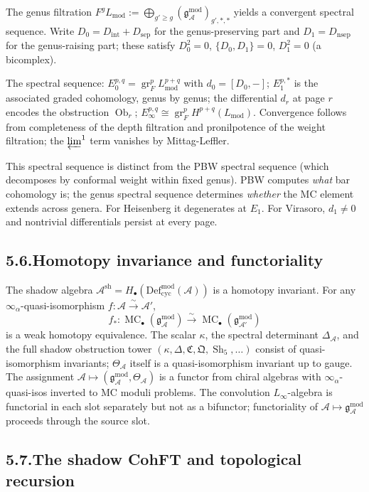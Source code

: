\documentclass[11pt]{report}
\theoremstyle{definition}
\theoremstyle{remark}
\providecommand{\cA}{\mathcal{A}}
\providecommand{\gAmod}{\mathfrak{g}^{\mathrm{mod}}_\cA}
\providecommand{\Defcyc}{\mathrm{Def}_{\mathrm{cyc}}}
\numberwithin{equation}{section}
\begin{document}
The genus filtration $F^g L_{\mathrm{mod}}:=\bigoplus_{g'\ge g}(\gAmod)_{g',*,*}$
yields a convergent spectral sequence. Write
$D_0=D_{\mathrm{int}}+D_{\mathrm{sep}}$ for the genus-preserving part
and $D_1=D_{\mathrm{nsep}}$ for the genus-raising part; these satisfy
$D_0^2=0$, $\{D_0,D_1\}=0$, $D_1^2=0$ (a bicomplex).

The spectral sequence: $E_0^{p,q}=\operatorname{gr}_F^p L_{\mathrm{mod}}^{p+q}$
with $d_0=[D_0,-]$; $E_1^{p,*}$ is the associated graded cohomology,
genus by genus; the differential $d_r$ at page $r$ encodes the
obstruction $\operatorname{Ob}_r$; $E_\infty^{p,q}\cong\operatorname{gr}_F^p H^{p+q}(L_{\mathrm{mod}})$.
Convergence follows from completeness of the depth filtration and
pronilpotence of the weight filtration; the $\varprojlim^1$ term
vanishes by Mittag-Leffler.

This spectral sequence is distinct from the PBW spectral sequence
(which decomposes by conformal weight within fixed genus). PBW
computes \emph{what} bar cohomology is; the genus spectral sequence
determines \emph{whether} the MC element extends across genera. For
Heisenberg it degenerates at $E_1$. For Virasoro, $d_1\neq 0$ and
nontrivial differentials persist at every page.

\subsection*{5.6.\enspace Homotopy invariance and functoriality}

The shadow algebra $\cA^{\mathrm{sh}}=H_\bullet(\Defcyc^{\mathrm{mod}}(\cA))$
is a homotopy invariant. For any $\infty_\alpha$-quasi-isomorphism
$f\colon\cA\xrightarrow{\sim}\cA'$,
\[
f_*\colon\operatorname{MC}_\bullet(\gAmod)\xrightarrow{\;\sim\;}\operatorname{MC}_\bullet(\mathfrak g^{\mathrm{mod}}_{\cA'})
\]
is a weak homotopy equivalence. The scalar $\kappa$, the spectral
determinant $\Delta_\cA$, and the full shadow obstruction tower
$(\kappa,\Delta,\mathfrak C,\mathfrak Q,\operatorname{Sh}_5,\ldots)$
consist of quasi-isomorphism invariants; $\Theta_\cA$ itself is a
quasi-isomorphism invariant up to gauge. The assignment
$\cA\mapsto(\gAmod,\Theta_\cA)$ is a functor from chiral algebras with
$\infty_\alpha$-quasi-isos inverted to MC moduli problems. The
convolution $L_\infty$-algebra is functorial in each slot separately
but not as a bifunctor; functoriality of $\cA\mapsto\gAmod$ proceeds
through the source slot.

\subsection*{5.7.\enspace The shadow CohFT and topological recursion}
\end{document}
